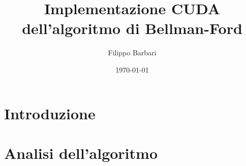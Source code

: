 \documentclass{article}
\title{Implementazione CUDA dell'algoritmo di Bellman-Ford}
\author{Filippo Barbari}
\date{\today}
\begin{document}
	
	\maketitle
	\newpage
	
	\tableofcontents
	\newpage
	
	\listoffigures
	\newpage
	
	\listoftables
	\newpage
	
	\section{Introduzione}
	
	\section{Analisi dell'algoritmo}
	
\end{document}
